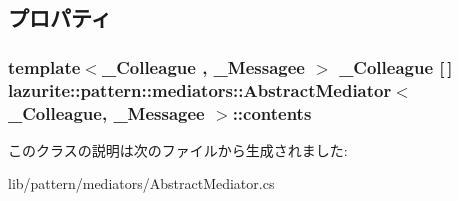 \subsection{プロパティ}
\hypertarget{classlazurite_1_1pattern_1_1mediators_1_1_abstract_mediator_3_01___colleague_00_01___messagee_01_4_ab18acb9b8868a428e77759e5274ac786}{
\subsubsection[{contents}]{\setlength{\rightskip}{0pt plus 5cm}template$<$\_\-Colleague , \_\-Messagee $>$ \_\-Colleague \mbox{[}$\,$\mbox{]} lazurite::pattern::mediators::AbstractMediator$<$ \_\-Colleague, \_\-Messagee $>$::contents}}
\label{classlazurite_1_1pattern_1_1mediators_1_1_abstract_mediator_3_01___colleague_00_01___messagee_01_4_ab18acb9b8868a428e77759e5274ac786}


このクラスの説明は次のファイルから生成されました:\begin{DoxyCompactItemize}
\item 
lib/pattern/mediators/AbstractMediator.cs\end{DoxyCompactItemize}
